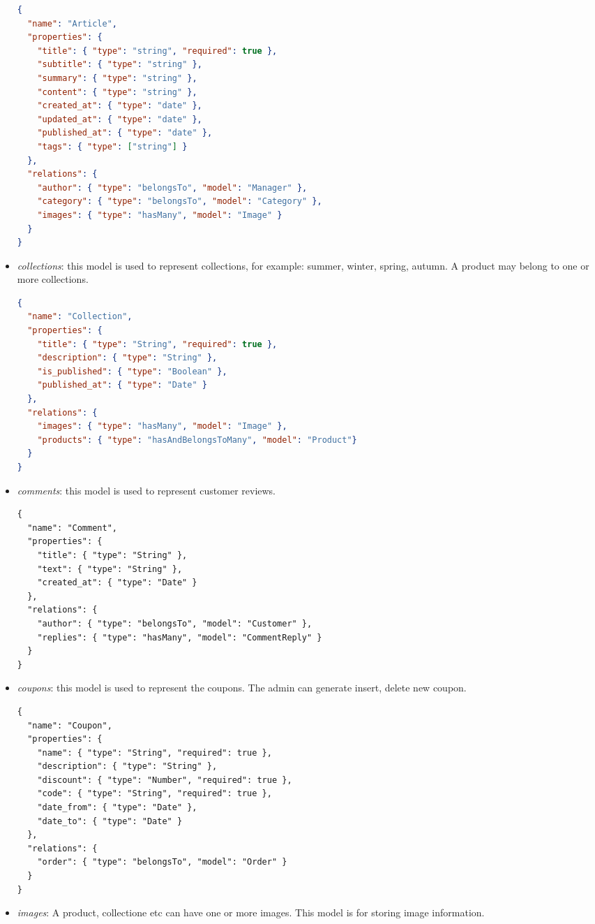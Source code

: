 \begin{itemize}
\begin{lstlisting}[language=json]
{
  "name": "Article",
  "properties": {
    "title": { "type": "string", "required": true },
    "subtitle": { "type": "string" },
    "summary": { "type": "string" },
    "content": { "type": "string" },
    "created_at": { "type": "date" },
    "updated_at": { "type": "date" },
    "published_at": { "type": "date" },
    "tags": { "type": ["string"] }
  },
  "relations": {
    "author": { "type": "belongsTo", "model": "Manager" },
    "category": { "type": "belongsTo", "model": "Category" },
    "images": { "type": "hasMany", "model": "Image" }
  }
}
\end{lstlisting}
\item \emph{collections}: this model is used to represent collections, for example: summer, winter, spring, autumn. A product may belong to one or more collections.
\begin{lstlisting}[language=json]
{
  "name": "Collection",
  "properties": {
    "title": { "type": "String", "required": true },
    "description": { "type": "String" },
    "is_published": { "type": "Boolean" },
    "published_at": { "type": "Date" }
  },
  "relations": {
    "images": { "type": "hasMany", "model": "Image" },
    "products": { "type": "hasAndBelongsToMany", "model": "Product"}
  }
}
\end{lstlisting}
\item \emph{comments}: this model is used to represent customer reviews.
\begin{lstlisting}
{
  "name": "Comment",
  "properties": {
    "title": { "type": "String" },
    "text": { "type": "String" },
    "created_at": { "type": "Date" }
  },
  "relations": {
    "author": { "type": "belongsTo", "model": "Customer" },
    "replies": { "type": "hasMany", "model": "CommentReply" }
  }
}
\end{lstlisting}
\item \emph{coupons}: this model is used to represent the coupons. The admin can generate insert, delete new coupon.
\begin{lstlisting}
{
  "name": "Coupon",
  "properties": {
    "name": { "type": "String", "required": true },
    "description": { "type": "String" },
    "discount": { "type": "Number", "required": true },
    "code": { "type": "String", "required": true },
    "date_from": { "type": "Date" },
    "date_to": { "type": "Date" }
  },
  "relations": {
    "order": { "type": "belongsTo", "model": "Order" }
  }
}
\end{lstlisting}
\item \emph{images}: A product, collectione etc can have one or more images. This model is for storing image information.

\end{itemize}
